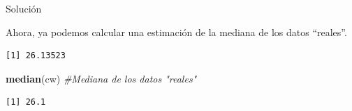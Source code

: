 \documentclass[
  ignorenonframetext,
]{beamer}
\newenvironment{Shaded}{\begin{snugshade}}{\end{snugshade}}
\newcommand{\CommentTok}[1]{\textcolor[rgb]{0.56,0.35,0.01}{\textit{#1}}}
\newcommand{\DecValTok}[1]{\textcolor[rgb]{0.00,0.00,0.81}{#1}}
\newcommand{\KeywordTok}[1]{\textcolor[rgb]{0.13,0.29,0.53}{\textbf{#1}}}
\newcommand{\NormalTok}[1]{#1}
\newcommand{\OperatorTok}[1]{\textcolor[rgb]{0.81,0.36,0.00}{\textbf{#1}}}
\newcommand{\StringTok}[1]{\textcolor[rgb]{0.31,0.60,0.02}{#1}}
\begin{document}
\begin{frame}[fragile]{Solución}
\protect\hypertarget{soluciuxf3n-34}{}

Ahora, ya podemos calcular una estimación de la mediana de los datos
``reales''.

\begin{Shaded}
\end{Shaded}

\begin{verbatim}
[1] 26.13523
\end{verbatim}

\begin{Shaded}
\begin{Highlighting}[]
\KeywordTok{median}\NormalTok{(cw) }\CommentTok{#Mediana de los datos "reales"}
\end{Highlighting}
\end{Shaded}

\begin{verbatim}
[1] 26.1
\end{verbatim}

\end{frame}
\end{document}
